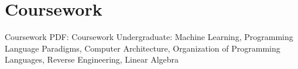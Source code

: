 \section
{Coursework}
{Coursework}
{PDF: Coursework}
\BulletItem
Undergraduate: 
Machine Learning, Programming Language Paradigms, Computer Architecture, Organization of Programming Languages, Reverse Engineering, Linear Algebra 
\hfill
